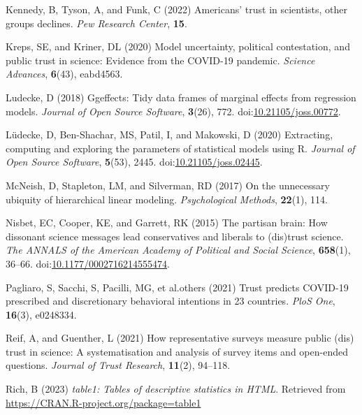 \documentclass[
  single column]{article}
\newlength{\cslhangindent}
\newenvironment{CSLReferences}[2] %
 {\begin{list}{}{%
  \setlength{\itemindent}{0pt}
  \setlength{\leftmargin}{0pt}
  \setlength{\parsep}{0pt}
  \ifodd #1
   \setlength{\leftmargin}{\cslhangindent}
   \setlength{\itemindent}{-1\cslhangindent}
  \fi
  \setlength{\itemsep}{#2\baselineskip}}}
 {\end{list}}
\begin{document}
\begin{CSLReferences}{1}{0}
Kennedy, B, Tyson, A, and Funk, C (2022) Americans' trust in scientists,
other groups declines. \emph{Pew Research Center}, \textbf{15}.

Kreps, SE, and Kriner, DL (2020) Model uncertainty, political
contestation, and public trust in science: Evidence from the COVID-19
pandemic. \emph{Science Advances}, \textbf{6}(43), eabd4563.

Ludecke, D (2018) Ggeffects: Tidy data frames of marginal effects from
regression models. \emph{Journal of Open Source Software},
\textbf{3}(26), 772.
doi:\href{https://doi.org/10.21105/joss.00772}{10.21105/joss.00772}.

Lüdecke, D, Ben-Shachar, MS, Patil, I, and Makowski, D (2020)
Extracting, computing and exploring the parameters of statistical models
using {R}. \emph{Journal of Open Source Software}, \textbf{5}(53), 2445.
doi:\href{https://doi.org/10.21105/joss.02445}{10.21105/joss.02445}.

McNeish, D, Stapleton, LM, and Silverman, RD (2017) On the unnecessary
ubiquity of hierarchical linear modeling. \emph{Psychological Methods},
\textbf{22}(1), 114.

Nisbet, EC, Cooper, KE, and Garrett, RK (2015) The partisan brain: How
dissonant science messages lead conservatives and liberals to (dis)trust
science. \emph{The ANNALS of the American Academy of Political and
Social Science}, \textbf{658}(1), 36--66.
doi:\href{https://doi.org/10.1177/0002716214555474}{10.1177/0002716214555474}.

Pagliaro, S, Sacchi, S, Pacilli, MG, et al.others (2021) Trust predicts
COVID-19 prescribed and discretionary behavioral intentions in 23
countries. \emph{PloS One}, \textbf{16}(3), e0248334.

Reif, A, and Guenther, L (2021) How representative surveys measure
public (dis) trust in science: A systematisation and analysis of survey
items and open-ended questions. \emph{Journal of Trust Research},
\textbf{11}(2), 94--118.

Rich, B (2023) \emph{table1: Tables of descriptive statistics in HTML}.
Retrieved from \url{https://CRAN.R-project.org/package=table1}


\end{CSLReferences}
\end{document}
